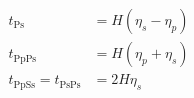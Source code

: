 $$
\boxed{\begin{aligned}
t_{\mathrm{Ps}} &= H \left(\eta_{s} - \eta_{p}\right)\\
t_{\mathrm{PpPs}} &= H \left(\eta_{p} + \eta_{s}\right)\\
t_{\mathrm{PpSs}} = t_{\mathrm{PsPs}} &= 2 H \eta_{s}
\end{aligned}}
\label{eq:delays}
$$
